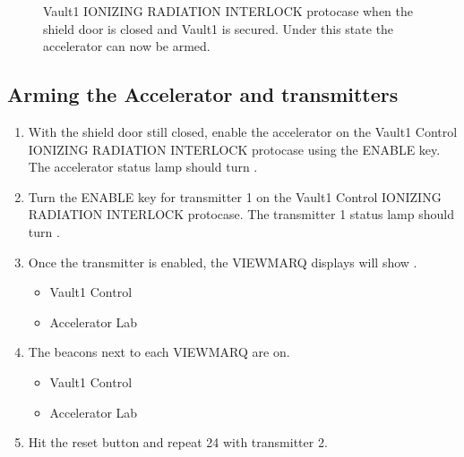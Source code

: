 \documentclass[letterpaper,10pt,english]{sphinxmanual}
\begin{document}
\begin{figure}[htbp]
\centering
\capstart

\noindent{}
\caption{ Vault\sphinxhyphen{}1 IONIZING RADIATION INTERLOCK protocase when the shield door is closed and Vault\sphinxhyphen{}1 is secured.
Under this state the accelerator can now be armed.}\label{\detokenize{testing_documentation/Vault-1_ionizing_radiation:id3}}\end{figure}


\subsection{Arming the Accelerator and transmitters}
\label{\detokenize{testing_documentation/Vault-1_ionizing_radiation:arming-the-accelerator-and-transmitters}}\begin{enumerate}
%
\item {} 
\sphinxAtStartPar
With the shield door still closed, enable the accelerator on the Vault\sphinxhyphen{}1 Control IONIZING RADIATION INTERLOCK protocase using the ENABLE key.
The accelerator status lamp should turn .

\item {} 
\sphinxAtStartPar
Turn the ENABLE key for transmitter 1 on the Vault\sphinxhyphen{}1 Control IONIZING RADIATION INTERLOCK protocase.
The transmitter 1 status lamp should turn .

\item {} 
\sphinxAtStartPar
Once the transmitter is enabled, the VIEWMARQ displays will show .
\begin{itemize}
\item {} 
\sphinxAtStartPar
Vault\sphinxhyphen{}1 Control

\item {} 
\sphinxAtStartPar
Accelerator Lab

\end{itemize}

\item {} 
\sphinxAtStartPar
The  beacons next to each VIEWMARQ are on.
\begin{itemize}
\item {} 
\sphinxAtStartPar
Vault\sphinxhyphen{}1 Control

\item {} 
\sphinxAtStartPar
Accelerator Lab

\end{itemize}

\item {} 
\sphinxAtStartPar
Hit the reset button and repeat 2\sphinxhyphen{}4 with transmitter 2.

\end{enumerate}
\end{document}
